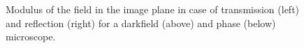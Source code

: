 \begin{figure}[H]
\begin{center}
\begin{tabular}{cc}
\end{tabular}

\end{center}
\caption{Modulus of the field in the image plane in case of
  transmission (left) and reflection (right) for a darkfield (above)
  and phase (below) microscope.}
\end{figure}

